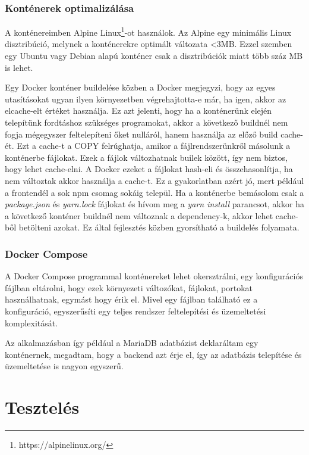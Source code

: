 \subsubsection{Konténerek optimalizálása}

A konténereimben Alpine Linux\footnote{https://alpinelinux.org/}-ot használok. Az Alpine egy minimális Linux disztribúció, melynek a konténerekre optimált változata <3MB. Ezzel szemben egy Ubuntu vagy Debian alapú konténer csak a disztribúciók miatt több száz MB is lehet.

Egy Docker konténer buildelése közben a Docker megjegyzi, hogy az egyes utasításokat ugyan ilyen környezetben végrehajtotta-e már, ha igen, akkor az elcache-elt értéket használja. Ez azt jelenti, hogy ha a konténerünk elején telepítünk fordtáshoz szükséges programokat, akkor a következő buildnél nem fogja mégegyszer feltelepíteni őket nulláról, hanem használja az előző build cache-ét. Ezt a cache-t a COPY felrúghatja, amikor a fájlrendszerünkről másolunk a konténerbe fájlokat. Ezek a fájlok változhatnak builek között, így nem biztos, hogy lehet cache-elni. A Docker ezeket a fájlokat hash-eli és összehasonlítja, ha nem változtak akkor használja a cache-t. Ez a gyakorlatban azért jó, mert például a frontendél a sok npm csomag sokáig települ. Ha a konténerbe bemásolom csak a \textit{package.json} és \textit{yarn.lock} fájlokat és hívom meg a \textit{yarn install} parancsot, akkor ha a következő konténer buildnél nem változnak a dependency-k, akkor lehet cache-ből betölteni azokat. Ez által fejlesztés közben gyorsítható a buildelés folyamata.

\subsubsection{Docker Compose}

A Docker Compose programmal konténereket lehet okersztrálni, egy konfigurációs fájlban eltárolni, hogy ezek környezeti változókat, fájlokat, portokat használhatnak, egymást hogy érik el. Mivel egy fájlban található ez a konfiguráció, egyszerűsíti egy teljes rendszer feltelepítési és üzemeltetési komplexitását.

Az alkalmazásban így például a MariaDB adatbázist deklaráltam egy konténernek, megadtam, hogy a backend azt érje el, így az adatbázis telepítése és üzemeltetése is nagyon egyszerű.

\section{Tesztelés}

